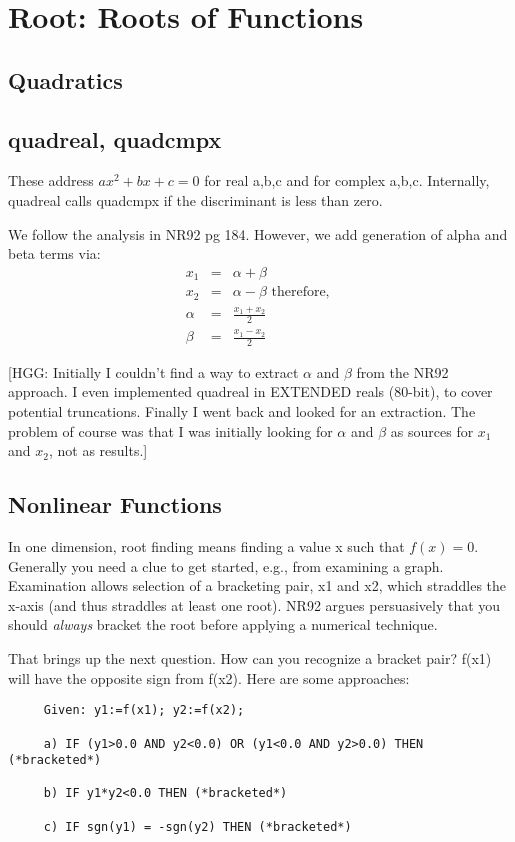 \section{Root: Roots of Functions}
\subsection{Quadratics}
\subsection*{quadreal, quadcmpx}
These address $ax^2+bx+c=0$ for real a,b,c and for complex a,b,c.
Internally, quadreal calls quadcmpx if the discriminant is less than zero.

We follow the analysis in NR92 pg 184.  However, we add generation of
alpha and beta terms via:
\begin{eqnarray}
  x_1    & = & \alpha + \beta\\
  x_2    & = & \alpha - \beta \mbox{ therefore, }\\  
  \alpha & = & \frac{x_1+x_2}{2}\\
  \beta  & = & \frac{x_1-x_2}{2}
\end{eqnarray}

[HGG: Initially I couldn't find a way to extract $\alpha$ and
$\beta$ from the NR92 approach.  I even implemented quadreal in
EXTENDED reals (80-bit), to cover potential truncations.  Finally I went
back and looked for an extraction.  The problem of course was that
I was initially looking for $\alpha$ and $\beta$ as sources for
$x_1$ and $x_2$, not as results.]

\subsection{Nonlinear Functions}
In one dimension, root finding means finding a value x such
that $f(x) = 0$.  Generally you need a clue to get started,
e.g., from examining a graph.  Examination allows selection
of a bracketing pair, x1 and x2, which straddles the x-axis
(and thus straddles at least one root).  NR92 argues
persuasively that you should {\em always} bracket the root
before applying a numerical technique.

That brings up the next question.  How can you recognize a
bracket pair?  f(x1) will have the opposite sign from f(x2).
Here are some approaches:
\begin{verbatim}
     Given: y1:=f(x1); y2:=f(x2);
     
     a) IF (y1>0.0 AND y2<0.0) OR (y1<0.0 AND y2>0.0) THEN (*bracketed*)
     
     b) IF y1*y2<0.0 THEN (*bracketed*)
     
     c) IF sgn(y1) = -sgn(y2) THEN (*bracketed*)
\end{verbatim}

